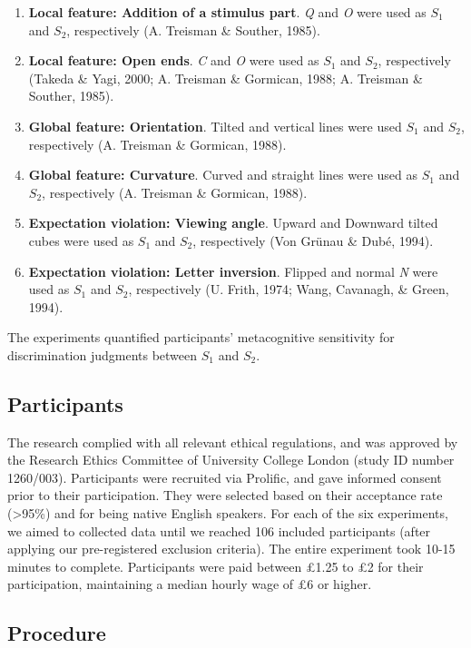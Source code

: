 \documentclass[12pt,twoside]{reedthesis}
\providecommand{\tightlist}{%
  \setlength{\itemsep}{0pt}\setlength{\parskip}{0pt}}
\begin{document}
\begin{enumerate}
\def\labelenumi{\arabic{enumi}.}
\tightlist
\item
  \textbf{Local feature: Addition of a stimulus part}. \emph{Q} and \emph{O} were used as \(S_1\) and \(S_2\), respectively (A. Treisman \& Souther, 1985).
\item
  \textbf{Local feature: Open ends}. \emph{C} and \emph{O} were used as \(S_1\) and \(S_2\), respectively (Takeda \& Yagi, 2000; A. Treisman \& Gormican, 1988; A. Treisman \& Souther, 1985).
\item
  \textbf{Global feature: Orientation}. Tilted and vertical lines were used \(S_1\) and \(S_2\), respectively (A. Treisman \& Gormican, 1988).
\item
  \textbf{Global feature: Curvature}. Curved and straight lines were used as \(S_1\) and \(S_2\), respectively (A. Treisman \& Gormican, 1988).
\item
  \textbf{Expectation violation: Viewing angle}. Upward and Downward tilted cubes were used as \(S_1\) and \(S_2\), respectively (Von Grünau \& Dubé, 1994).
\item
  \textbf{Expectation violation: Letter inversion}. Flipped and normal \emph{N} were used as \(S_1\) and \(S_2\), respectively (U. Frith, 1974; Wang, Cavanagh, \& Green, 1994).
\end{enumerate}
The experiments quantified participants' metacognitive sensitivity for discrimination judgments between \(S_1\) and \(S_2\).

\hypertarget{participants-8}{%
\subsection{Participants}\label{participants-8}}

The research complied with all relevant ethical regulations, and was approved by the Research Ethics Committee of University College London (study ID number 1260/003). Participants were recruited via Prolific, and gave informed consent prior to their participation. They were selected based on their acceptance rate (\textgreater95\%) and for being native English speakers. For each of the six experiments, we aimed to collected data until we reached 106 included participants (after applying our pre-registered exclusion criteria). The entire experiment took 10-15 minutes to complete. Participants were paid between £1.25 to £2 for their participation, maintaining a median hourly wage of £6 or higher.

\hypertarget{procedure-4}{%
\subsection{Procedure}\label{procedure-4}}
\end{document}
